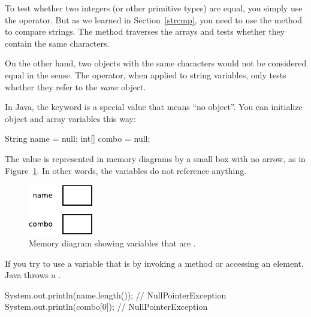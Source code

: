 
To test whether two integers (or other primitive types) are equal, you simply use the \java{==} operator.
But as we learned in Section~\ref{strcmp}, you need to use the  method to compare strings.
The  method traverses the arrays and tests whether they contain the same characters.

On the other hand, two  objects with the same characters would not be considered equal in the \java{==} sense.
The \java{==} operator, when applied to string variables, only tests whether they refer to the {\em same} object.




In Java, the keyword  is a special value that means ``no object''.
You can initialize object and array variables this way:

\begin{code}
String name = null;
int[] combo = null;
\end{code}

The value  is represented in memory diagrams by a small box with no arrow, as in Figure~\ref{fig.mem4}.
In other words, the variables do not reference anything.

\begin{figure}[!ht]
\begin{center}
\includegraphics[width=80pt]{figs/mem4.pdf}
\caption{Memory diagram showing variables that are .}
\label{fig.mem4}
\end{center}
\end{figure}


If you try to use a variable that is  by invoking a method or accessing an element, Java throws a .

\begin{code}
System.out.println(name.length());  // NullPointerException
System.out.println(combo[0]);       // NullPointerException
\end{code}

